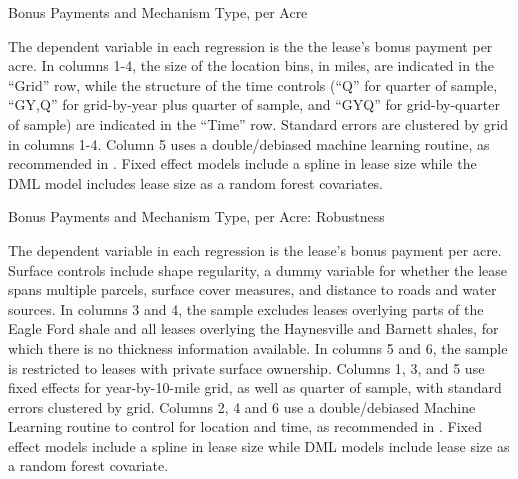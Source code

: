 \documentclass[12pt]{article}
\begin{document}
\begin{appendices}
\addtolength{\tabcolsep}{6pt}
\begin{table}[H]
	\begin{center}
	\begin{threeparttable}
		\caption{Bonus Payments and Mechanism Type, per Acre}
		\label{tab:table_main_bonus_levels}
		\small
		            
		\begin{tablenotes}
		\footnotesize
		\item The dependent variable in each regression is the the lease's bonus payment per acre. In columns 1-4, the size of the location bins, in miles, are indicated in the ``Grid'' row, while the structure of the time controls (``Q'' for quarter of sample, ``GY,Q'' for grid-by-year plus quarter of sample, and ``GYQ'' for grid-by-quarter of sample) are indicated in the ``Time'' row.  Standard errors are clustered by grid in columns 1-4.  Column 5 uses a double/debiased machine learning routine, as recommended in \cite{chernozhukov2018double}.  Fixed effect models include a spline in lease size while the DML model includes lease size as a random forest covariates.  
		\end{tablenotes}
	\end{threeparttable}
	\end{center}
\end{table}

\begin{table}[H]
	\begin{center}
	\begin{threeparttable}
		\caption{Bonus Payments and Mechanism Type, per Acre: Robustness}
		\label{tab:table_main_bonus_levels_robust}
		\small
		            
		\begin{tablenotes}
		\footnotesize
		\item The dependent variable in each regression is the lease's bonus payment per acre.  Surface controls include shape regularity, a dummy variable for whether the lease spans multiple parcels, surface cover measures, and distance to roads and water sources.  In columns 3 and 4, the sample excludes leases overlying parts of the Eagle Ford shale and all leases overlying the Haynesville and Barnett shales, for which there is no thickness information available.  In columns 5 and 6, the sample is restricted to leases with private surface ownership.  Columns 1, 3, and 5  use fixed effects for year-by-10-mile grid, as well as quarter of sample, with standard errors clustered by grid.  Columns 2, 4 and 6 use a double/debiased Machine Learning routine to control for location and time, as recommended in \cite{chernozhukov2018double}.  Fixed effect models include a spline in lease size while DML models include lease size as a random forest covariate.
		\end{tablenotes}
	\end{threeparttable}
	\end{center}
\end{table}



\end{appendices}
\end{document}
